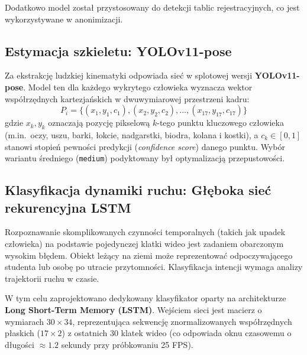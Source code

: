 Dodatkowo model został przystosowany do detekcji tablic rejestracyjnych, co jest wykorzystywane w anonimizacji.

\subsection{Estymacja szkieletu: YOLOv11-pose}
Za ekstrakcję ludzkiej kinematyki odpowiada sieć w splotowej wersji \textbf{YOLOv11-pose}. Model ten dla każdego wykrytego człowieka wyznacza wektor współrzędnych kartezjańskich w dwuwymiarowej przestrzeni kadru:
\begin{equation}
    P_i = \{(x_1, y_1, c_1), (x_2, y_2, c_2), \dots, (x_{17}, y_{17}, c_{17})\}
\end{equation}
gdzie $x_k, y_k$ oznaczają pozycję pikselową $k$-tego punktu kluczowego człowieka (m.in.\ oczy, uszu, barki, łokcie, nadgarstki, biodra, kolana i kostki), a $c_k \in [0, 1]$ stanowi stopień pewności predykcji (\textit{confidence score}) danego punktu. Wybór wariantu średniego (\texttt{medium}) podyktowany był optymalizacją przepustowości.

\subsection{Klasyfikacja dynamiki ruchu: Głęboka sieć rekurencyjna LSTM}
Rozpoznawanie skomplikowanych czynności temporalnych (takich jak upadek człowieka) na podstawie pojedynczej klatki wideo jest zadaniem obarczonym wysokim błędem. Obiekt leżący na ziemi może reprezentować odpoczywającego studenta lub osobę po utracie przytomności. Klasyfikacja intencji wymaga analizy trajektorii ruchu w czasie.

W tym celu zaprojektowano dedykowany klasyfikator oparty na architekturze \textbf{Long Short-Term Memory (LSTM)}. Wejściem sieci jest macierz o wymiarach $30 \times 34$, reprezentująca sekwencję znormalizowanych współrzędnych płaskich ($17 \times 2$) z ostatnich 30 klatek wideo (co odpowiada oknu czasowemu o długości $\approx 1.2$ sekundy przy próbkowaniu 25 FPS).

